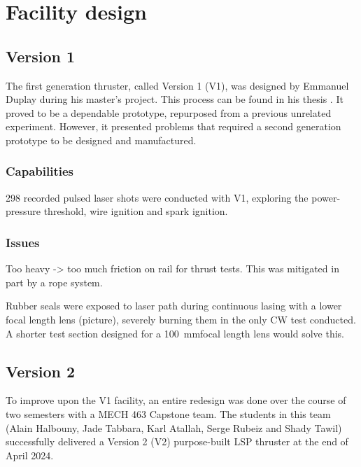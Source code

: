 \chapter{Facility design}
    \section{Version 1} \label{sec:design_v1}

        The first generation thruster, called Version 1 (V1), was designed by Emmanuel Duplay during his master's project. This process can be found in his thesis \cite{duplayArgonLaserPlasmaThruster2024a}. It proved to be a dependable prototype, repurposed from a previous unrelated experiment. However, it presented problems that required a second generation prototype to be designed and manufactured.

        \subsection{Capabilities}

            298 recorded pulsed laser shots were conducted with V1, exploring the power-pressure threshold, wire ignition and spark ignition.

        \subsection{Issues}

            Too heavy -> too much friction on rail for thrust tests. This was mitigated in part by a rope system.

            Rubber seals were exposed to laser path during continuous lasing with a lower focal length lens (picture), severely burning them in the only CW test conducted. A shorter test section designed for a \qty{100}{mm}focal length lens would solve this.







    \section{Version 2} \label{sec:design_v2}

        To improve upon the V1 facility, an entire redesign was done over the course of two semesters with a MECH 463 Capstone team. The students in this team (Alain Halbouny, Jade Tabbara, Karl Atallah, Serge Rubeiz and Shady Tawil) successfully delivered a Version 2 (V2) purpose-built LSP thruster at the end of April 2024.

